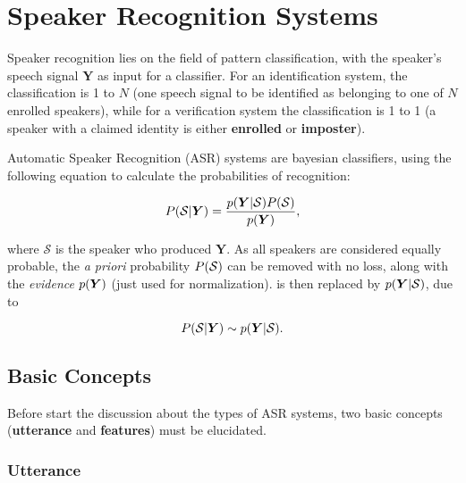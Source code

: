 \chapter{Speaker Recognition Systems}
\label{ch:speaker-recognition-systems}

Speaker recognition lies on the field of pattern classification, with the speaker's speech signal $\boldsymbol{Y}$ as input for a classifier. For an identification system, the classification is 1 to $N$ (one speech signal to be identified as belonging to one of $N$ enrolled speakers), while for a verification system the classification is 1 to 1 (a speaker with a claimed identity is either \textbf{enrolled} or \textbf{imposter}).

Automatic Speaker Recognition (ASR) systems are bayesian classifiers, using the following equation to calculate the probabilities of recognition:

\begin{equation}
    \postprob{\mathcal{S}}{\boldsymbol{Y}} = \frac{\postpdf{\boldsymbol{Y}}{\mathcal{S}} \prob{\mathcal{S}}}{\pdf{\boldsymbol{Y}}},
    \label{eq:bayes_equation}
\end{equation}

\noindent where $\mathcal{S}$ is the speaker who produced $\boldsymbol{Y}$. As all speakers are considered equally probable, the \emph{a priori} probability $P(\mathcal{S})$ can be removed with no loss, along with the \emph{evidence} $p(\boldsymbol{Y})$ (just used for normalization).  is then replaced by $p(\boldsymbol{Y}|\mathcal{S})$, due to

\begin{equation}
    \postprob{\mathcal{S}}{\boldsymbol{Y}} \sim \postpdf{\boldsymbol{Y}}{\mathcal{S}}.
    \label{eq:bayes_equation_simplified}
\end{equation}

\section{Basic Concepts}
\label{sec:basic-concepts}

Before start the discussion about the types of ASR systems, two basic concepts (\textbf{utterance} and \textbf{features}) must be elucidated.

\subsection{Utterance}


